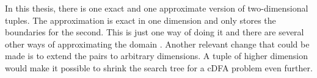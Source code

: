\documentclass[a4paper,11pt]{article}
\begin{document}
In this thesis, there is one exact and one approximate version of two-dimensional tuples. The approximation is exact in one dimension and only stores the boundaries for the second. This is just one way of doing it and there are several other ways of approximating the domain \cite{Monette771427}. Another relevant change that could be made is to extend the pairs to arbitrary dimensions. A tuple of higher dimension would make it possible to shrink the search tree for a cDFA problem even further.





%
%
%
%
\end{document}
